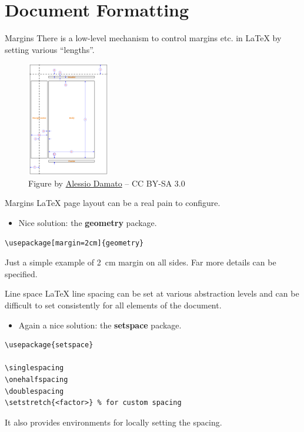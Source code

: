 \documentclass[english]{beamer}
\begin{document}
\section{Document Formatting}



\begin{frame}{\insertsection}{Margins}
  There is a low-level mechanism to control margins etc. in \LaTeX{} by
  setting various ``lengths''.
  \begin{figure}
    \centering
    \includegraphics[height=5cm]{Latex_layout.png}
    \caption{Figure by
      \href{http://commons.wikimedia.org/wiki/File:Latex_layout.svg}{Alessio
        Damato} -- CC BY-SA 3.0}
  \end{figure}
\end{frame}

\begin{frame}[fragile]{\insertsection}{Margins}
  \LaTeX{} page layout can be a real pain to configure.
  \begin{itemize}
  \item Nice solution: the \textbf{geometry} package.
  \end{itemize}
\begin{verbatim}
\usepackage[margin=2cm]{geometry}
\end{verbatim}
  Just a simple example of \SI{2}{\centi\meter} margin on all
  sides. Far more details can be specified.
\end{frame}

\begin{frame}[fragile]{\insertsection}{Line space}
  \LaTeX{} line spacing can be set at various abstraction levels and
  can be difficult to set consistently for all elements of the
  document.
  \begin{itemize}
  \item Again a nice solution: the \textbf{setspace} package.
  \end{itemize}
\begin{verbatim}
\usepackage{setspace}

\singlespacing
\onehalfspacing
\doublespacing
\setstretch{<factor>} % for custom spacing
\end{verbatim}
  It also provides environments for locally setting the spacing.
\end{frame}
\end{document}
